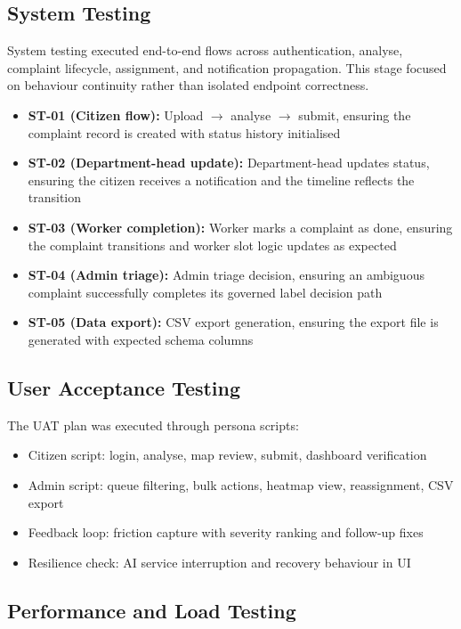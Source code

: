 \subsection{System Testing}

System testing executed end-to-end flows across authentication, analyse, complaint lifecycle, assignment, and notification propagation. This stage focused on behaviour continuity rather than isolated endpoint correctness.

\begin{itemize}
\item \textbf{ST-01 (Citizen flow):} Upload $\rightarrow$ analyse $\rightarrow$ submit, ensuring the complaint record is created with status history initialised
\item \textbf{ST-02 (Department-head update):} Department-head updates status, ensuring the citizen receives a notification and the timeline reflects the transition
\item \textbf{ST-03 (Worker completion):} Worker marks a complaint as done, ensuring the complaint transitions and worker slot logic updates as expected
\item \textbf{ST-04 (Admin triage):} Admin triage decision, ensuring an ambiguous complaint successfully completes its governed label decision path
\item \textbf{ST-05 (Data export):} CSV export generation, ensuring the export file is generated with expected schema columns
\end{itemize}

\subsection{User Acceptance Testing}

The UAT plan was executed through persona scripts:

\begin{itemize}
\item Citizen script: login, analyse, map review, submit, dashboard verification
\item Admin script: queue filtering, bulk actions, heatmap view, reassignment, CSV export
\item Feedback loop: friction capture with severity ranking and follow-up fixes
\item Resilience check: AI service interruption and recovery behaviour in UI
\end{itemize}

\subsection{Performance and Load Testing}

